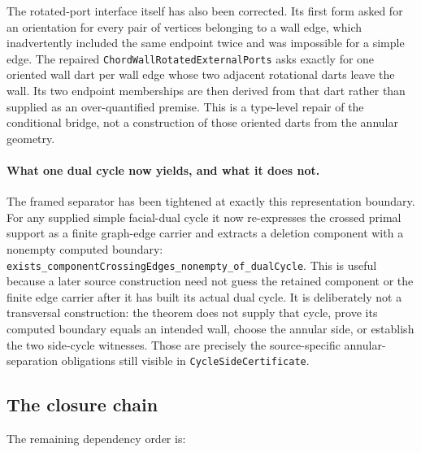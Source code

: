 \documentclass[11pt]{article}
\theoremstyle{definition}
\begin{document}
The rotated-port interface itself has also been corrected.  Its first form
asked for an orientation for every pair of vertices belonging to a wall edge,
which inadvertently included the same endpoint twice and was impossible for
a simple edge.  The repaired
\texttt{ChordWallRotatedExternalPorts} asks exactly for one oriented wall dart
per wall edge whose two adjacent rotational darts leave the wall.  Its two
endpoint memberships are then derived from that dart rather than supplied as
an over-quantified premise.  This is a type-level repair of the conditional
bridge, not a construction of those oriented darts from the annular geometry.

\paragraph{What one dual cycle now yields, and what it does not.}  The
framed separator has been tightened at exactly this representation boundary.
For any supplied simple facial-dual cycle it now re-expresses the crossed
primal support as a finite graph-edge carrier and extracts a deletion
component with a nonempty computed boundary:
\texttt{exists\_componentCrossingEdges\_nonempty\_of\_dualCycle}.
This is useful because a later source construction need not guess the
retained component or the finite edge carrier after it has built its actual
dual cycle.  It is deliberately not a transversal construction: the theorem
does not supply that cycle, prove its computed boundary equals an intended
wall, choose the annular side, or establish the two side-cycle witnesses.
Those are precisely the source-specific annular-separation obligations still
visible in \texttt{CycleSideCertificate}.

\subsection{The closure chain}

The remaining dependency order is:
\end{document}
